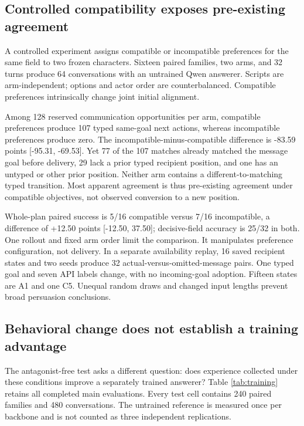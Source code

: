 \documentclass{svproc}
\begin{document}
\subsection{Controlled compatibility exposes pre-existing agreement}
A controlled experiment assigns compatible or incompatible preferences for the same field to two frozen characters. Sixteen paired families, two arms, and 32 turns produce 64 conversations with an untrained Qwen answerer. Scripts are arm-independent; options and actor order are counterbalanced. Compatible preferences intrinsically change joint initial alignment.

Among 128 reserved communication opportunities per arm, compatible preferences produce 107 typed same-goal next actions, whereas incompatible preferences produce zero. The incompatible-minus-compatible difference is -83.59 points [-95.31, -69.53]. Yet 77 of the 107 matches already matched the message goal before delivery, 29 lack a prior typed recipient position, and one has an untyped or other prior position. Neither arm contains a different-to-matching typed transition. Most apparent agreement is thus pre-existing agreement under compatible objectives, not observed conversion to a new position.

Whole-plan paired success is 5/16 compatible versus 7/16 incompatible, a difference of +12.50 points [-12.50, 37.50]; decisive-field accuracy is 25/32 in both. One rollout and fixed arm order limit the comparison. It manipulates preference configuration, not delivery. In a separate availability replay, 16 saved recipient states and two seeds produce 32 actual-versus-omitted-message pairs. One typed goal and seven API labels change, with no incoming-goal adoption. Fifteen states are A1 and one C5. Unequal random draws and changed input lengths prevent broad persuasion conclusions.

\subsection{Behavioral change does not establish a training advantage}
The antagonist-free test asks a different question: does experience collected under these conditions improve a separately trained answerer? Table \ref{tab:training} retains all completed main evaluations. Every test cell contains 240 paired families and 480 conversations. The untrained reference is measured once per backbone and is not counted as three independent replications.
\end{document}
